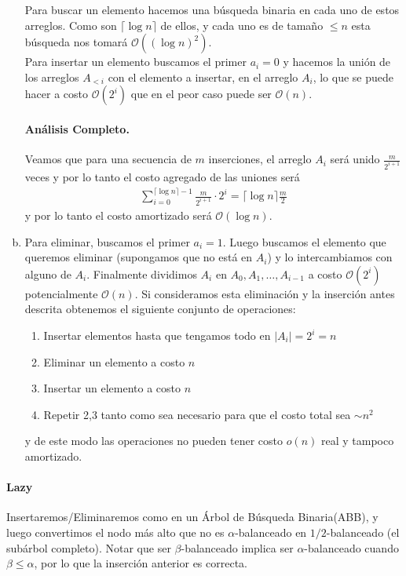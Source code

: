 \documentclass[dcc,uchile]{fcfmcourse}
\theoremstyle{plain}
\theoremstyle{definition}
\begin{document}
\begin{problems}
\begin{enumerate}[a)]
    Para buscar un elemento hacemos una búsqueda binaria en cada uno de estos arreglos. Como son $\lceil \log n \rceil$ de ellos, y cada uno es de tamaño $\le n$ esta búsqueda nos tomará $\mathcal{O}((\log n)^2)$.\\
    
    Para insertar un elemento buscamos el primer $a_{i} = 0$ y hacemos la unión de los arreglos $A_{<i}$ con el elemento a insertar, en el arreglo $A_{i}$, lo que se puede hacer a costo $\mathcal{O}(2^i)$ que en el peor caso puede ser $\mathcal{O}(n)$.
    
    \paragraph{Análisis Completo.} Veamos que para una secuencia de $m$ inserciones, el arreglo $A_i$ será unido $\frac{m}{2^{i+1}}$ veces y por lo tanto el costo agregado de las uniones será 
    \begin{align*}
        \sum_{i=0}^{\lceil \log n \rceil - 1} \frac{m}{2^{i+1}} \cdot 2^i = \lceil \log n \rceil \frac{m}{2}
     \end{align*}
    y por lo tanto el costo amortizado será $\mathcal{O}(\log n)$.
    \item Para eliminar, buscamos el primer $a_{i} = 1$. Luego buscamos el elemento que queremos eliminar (supongamos que no está en $A_{i}$) y lo intercambiamos con alguno de $A_i$. Finalmente dividimos $A_i$ en $A_0, A_1, \ldots, A_{i-1}$ a costo $\mathcal{O}(2^i)$ potencialmente $\mathcal{O}(n)$. Si consideramos esta eliminación y la inserción antes descrita obtenemos el siguiente conjunto de operaciones:
    \begin{enumerate}[1.]
        \item Insertar elementos hasta que tengamos todo en $|A_i| = 2^i = n$
        \item Eliminar un elemento a costo $n$
        \item Insertar un elemento a costo $n$
        \item Repetir 2,3 tanto como sea necesario para que el costo total sea $\sim n^2$
    \end{enumerate}
    y de este modo las operaciones no pueden tener costo $o(n)$ real y tampoco amortizado.
\end{enumerate}
\problem 
\paragraph{Lazy} Insertaremos/Eliminaremos como en un Árbol de Búsqueda Binaria(ABB), y luego convertimos el nodo más alto que no es $\alpha$-balanceado en $1/2$-balanceado (el subárbol completo). Notar que ser $\beta$-balanceado implica ser $\alpha$-balanceado cuando $\beta\le\alpha$, por lo que la inserción anterior es correcta.

\end{problems}
\end{document}
